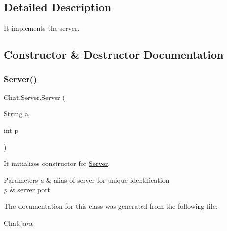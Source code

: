 \subsection{Detailed Description}
It implements the server. 

\subsection{Constructor \& Destructor Documentation}
\mbox{\label{class_chat_1_1_server_a3d7288f69967e91d0f3dbfb148f4270b}} 
\subsubsection{\texorpdfstring{Server()}{Server()}}
{\footnotesize\ttfamily Chat.\+Server.\+Server (\begin{DoxyParamCaption}\item[{String}]{a,  }\item[{int}]{p }\end{DoxyParamCaption})}



It initializes constructor for \hyperlink{class_chat_1_1_server}{Server}. 


\begin{DoxyParams}{Parameters}
{\em a} & alias of server for unique identification \\
\hline
{\em p} & server port \\
\hline
\end{DoxyParams}


The documentation for this class was generated from the following file\+:\begin{DoxyCompactItemize}
\item 
Chat.\+java\end{DoxyCompactItemize}
